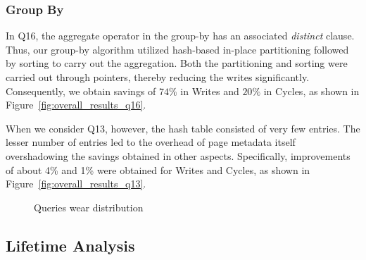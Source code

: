 \subsubsection{Group By}

In Q16, the aggregate operator in the group-by has
an associated \textit{distinct} clause.  Thus, our group-by algorithm
utilized hash-based in-place partitioning followed by sorting to carry
out the aggregation. Both the partitioning and sorting were carried out
through pointers, thereby reducing the writes significantly. Consequently,
we obtain savings of $74\%$ in Writes and $20\%$ in Cycles, as shown in
Figure~\ref{fig:overall_results_q16}.

 

When we consider Q13, however, the hash table consisted of very few entries. The lesser number of entries led to the overhead of page metadata itself overshadowing the savings obtained in other aspects. Specifically, improvements of
about 4\% and 1\% were obtained for Writes and Cycles, as shown in
Figure~\ref{fig:overall_results_q13}.

\begin{comment}

The data at this stage of the group-by was about 6 MB. Using the
bounds derived in Equations \ref{eq:gby_conv_sort} and \ref{eq:gby_ptr_hybrid}, the write ratios of the native and
PCM-conscious algorithms would be within $\frac{ \frac{2 \times size_{ptr}}{N_R
L_R} + 1}{2+ln\frac{N_R L_R}{|DRAM|} + 1} = \frac{1}{3+ln\frac {6M}{4M}
} \approx 29\%$, which is in accordance with the empirical savings of 74\%.

\end{comment}

\begin{figure*}[htbp]
\centering

\caption{Queries wear distribution }
\label{fig:wear_dist}
\end{figure*}



\subsection{Lifetime Analysis}
\begin{comment}
In \cite{qureshi}, the ideal lifetime $Y$ of a PCM device with size $S$
GB, $B$ write traffic, and cell endurance $W_{max}$, is given by:

$Y(years) = \frac{W_{max} \times S}{B} \times 2^{-25}$\\
\end{comment}

